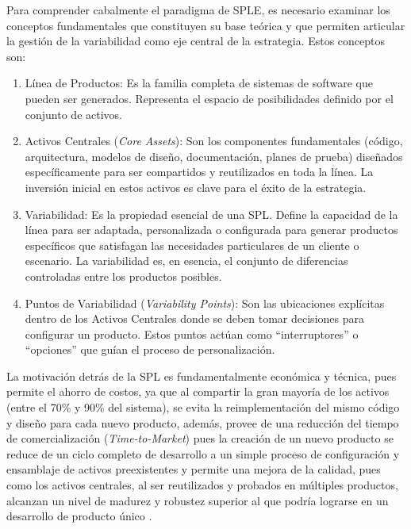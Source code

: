 Para comprender cabalmente el paradigma de \ac{SPLE}, es necesario examinar los conceptos 
fundamentales que constituyen su base teórica y que permiten articular la gestión 
de la variabilidad como eje central de la estrategia. Estos conceptos son:

\begin{enumerate}
    \item Línea de Productos: Es la familia completa de sistemas de software
    que pueden ser generados. Representa el espacio de posibilidades
    definido por el conjunto de activos.
    \item Activos Centrales (\textit{Core Assets}): Son los componentes fundamentales
    (código, arquitectura, modelos de diseño, documentación, planes de
    prueba) diseñados específicamente para ser compartidos y reutilizados
    en toda la línea. La inversión inicial en estos activos es clave para el
    éxito de la estrategia.
    \item Variabilidad: Es la propiedad esencial de una \ac{SPL}. Define la capacidad
    de la línea para ser adaptada, personalizada o configurada para generar
    productos específicos que satisfagan las necesidades particulares de un
    cliente o escenario. La variabilidad es, en esencia, el conjunto de
    diferencias controladas entre los productos posibles.
    \item Puntos de Variabilidad (\textit{Variability Points}): Son las ubicaciones
    explícitas dentro de los Activos Centrales donde se deben tomar
    decisiones para configurar un producto. Estos puntos actúan como
    ``interruptores'' o ``opciones'' que guían el proceso de personalización.
\end{enumerate}

La motivación detrás de la \ac{SPL} es fundamentalmente económica y técnica,
pues permite el ahorro de costos, ya que al compartir la gran mayoría de los
activos (entre el 70\% y 90\% del sistema), se evita la reimplementación del
mismo código y diseño para cada nuevo producto, además, provee de una reducción 
del tiempo de comercialización (\textit{Time-to-Market}) pues la creación de
un nuevo producto se reduce de un ciclo completo de desarrollo a un simple
proceso de configuración y ensamblaje de activos preexistentes y permite una
mejora de la calidad, pues como los activos centrales, al ser reutilizados y
probados en múltiples productos, alcanzan un nivel de madurez y robustez
superior al que podría lograrse en un desarrollo de producto único \citep{ingenieria_software_lps}.

